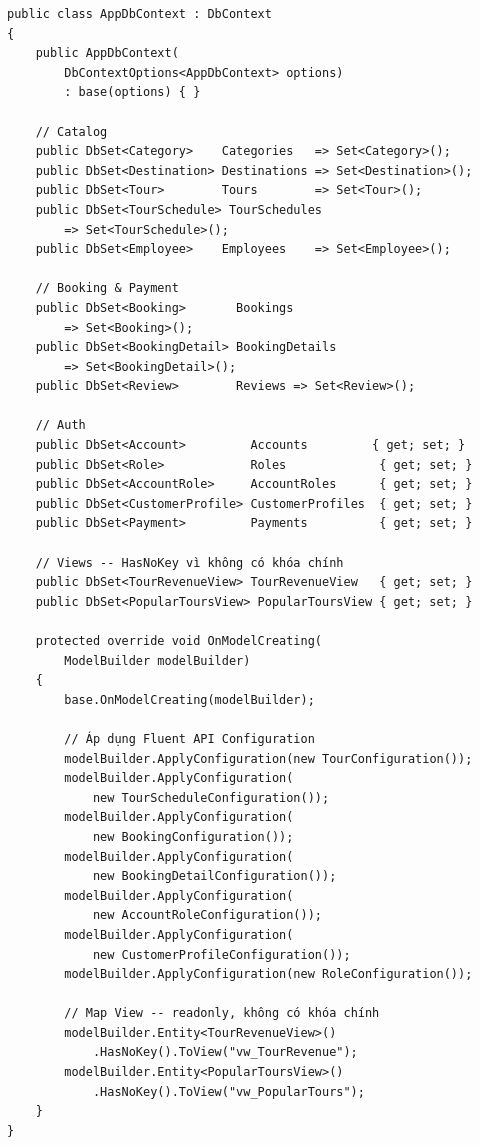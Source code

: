 \begin{lstlisting}[style=csharp,
  caption={AppDbContext -- 13 DbSet và cấu hình View},
  label={lst:dbctx}]
public class AppDbContext : DbContext
{
    public AppDbContext(
        DbContextOptions<AppDbContext> options)
        : base(options) { }

    // Catalog
    public DbSet<Category>    Categories   => Set<Category>();
    public DbSet<Destination> Destinations => Set<Destination>();
    public DbSet<Tour>        Tours        => Set<Tour>();
    public DbSet<TourSchedule> TourSchedules
        => Set<TourSchedule>();
    public DbSet<Employee>    Employees    => Set<Employee>();

    // Booking & Payment
    public DbSet<Booking>       Bookings
        => Set<Booking>();
    public DbSet<BookingDetail> BookingDetails
        => Set<BookingDetail>();
    public DbSet<Review>        Reviews => Set<Review>();

    // Auth
    public DbSet<Account>         Accounts         { get; set; }
    public DbSet<Role>            Roles             { get; set; }
    public DbSet<AccountRole>     AccountRoles      { get; set; }
    public DbSet<CustomerProfile> CustomerProfiles  { get; set; }
    public DbSet<Payment>         Payments          { get; set; }

    // Views -- HasNoKey vì không có khóa chính
    public DbSet<TourRevenueView> TourRevenueView   { get; set; }
    public DbSet<PopularToursView> PopularToursView { get; set; }

    protected override void OnModelCreating(
        ModelBuilder modelBuilder)
    {
        base.OnModelCreating(modelBuilder);

        // Áp dụng Fluent API Configuration
        modelBuilder.ApplyConfiguration(new TourConfiguration());
        modelBuilder.ApplyConfiguration(
            new TourScheduleConfiguration());
        modelBuilder.ApplyConfiguration(
            new BookingConfiguration());
        modelBuilder.ApplyConfiguration(
            new BookingDetailConfiguration());
        modelBuilder.ApplyConfiguration(
            new AccountRoleConfiguration());
        modelBuilder.ApplyConfiguration(
            new CustomerProfileConfiguration());
        modelBuilder.ApplyConfiguration(new RoleConfiguration());

        // Map View -- readonly, không có khóa chính
        modelBuilder.Entity<TourRevenueView>()
            .HasNoKey().ToView("vw_TourRevenue");
        modelBuilder.Entity<PopularToursView>()
            .HasNoKey().ToView("vw_PopularTours");
    }
}
\end{lstlisting}

